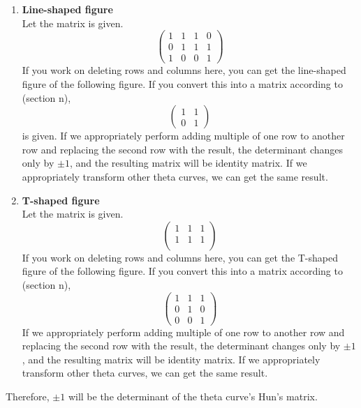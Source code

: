 \documentclass{article}
\begin{document}
\begin{enumerate}
    \item \textbf{Line-shaped figure}\\
    Let the matrix is given.
    $$\begin{pmatrix}
        1 & 1 & 1 & 0\\
        0 & 1 & 1 & 1\\
        1 & 0 & 0 & 1
    \end{pmatrix}$$
    If you work on deleting rows and columns here, you can get the line-shaped figure of the following figure. If you convert this into a matrix according to (section n),
    $$\begin{pmatrix}
        1 & 1 \\
        0 & 1
    \end{pmatrix}$$
    is given.
    If we appropriately perform adding multiple of one row to another row and replacing the second row with the result, the determinant changes only by $\pm 1$, and the resulting matrix will be identity matrix. If we appropriately transform other theta curves, we can get the same result.
    \item \textbf{T-shaped figure}\\
    Let the matrix is given.
    $$\begin{pmatrix}
        1 & 1 & 1\\
        1 & 1 & 1\\
    \end{pmatrix}$$
    If you work on deleting rows and columns here, you can get the T-shaped figure of the following figure. If you convert this into a matrix according to (section n),
    $$\begin{pmatrix}
        1 & 1 & 1\\
        0 & 1 & 0\\
        0 & 0 & 1
    \end{pmatrix}$$
    If we appropriately perform adding multiple of one row to another row and replacing the second row with the result, the determinant changes only by $\pm 1$, and the resulting matrix will be identity matrix. If we appropriately transform other theta curves, we can get the same result.
\end{enumerate}
Therefore, $\pm 1$ will be the determinant of the theta curve's Hun's matrix.
\end{document}
